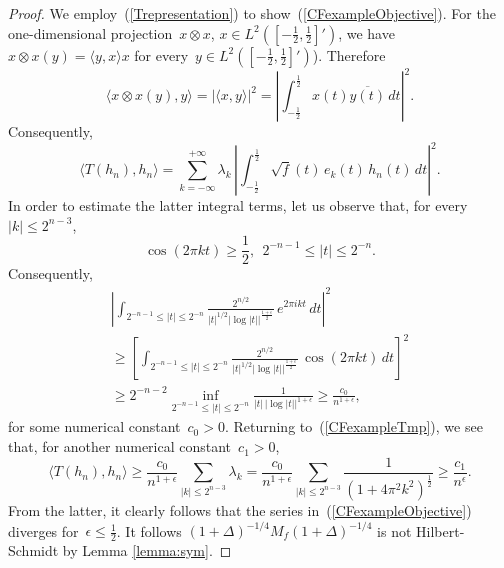 \documentclass[final,1p]{elsarticle}
\numberwithin{equation}{section}
\theoremstyle{plain}
\theoremstyle{definition}
\begin{document}
\begin{proof}
  We employ~(\ref{Trepresentation}) to show~(\ref{CFexampleObjective}).
   For the
  one-dimensional projection~$x \otimes x$, $x \in L^2([-\frac 12,
  \frac 12]')$, we have~$x \otimes x (y) = \langle y, x \rangle x$ for
  every~$y \in L^2([- \frac 12, \frac 12]')$).  Therefore $$ \langle x
  \otimes x (y), y \rangle = \left| \langle x, y \rangle \right|^2 =
  \left| \int_{-\frac 12}^{\frac 12} x(t) \overline{y(t)} \, dt \right|^2. $$
  Consequently,
  \begin{equation}
    \label{CFexampleTmp}
    \langle T(h_n), h_n \rangle = \sum_{k = - \infty}^{+\infty}
    \lambda_k \, \left| \int_{-\frac 12}^{\frac 12} \sqrt{f}(t)\,
       e_k(t)\, h_n(t)\, dt \right|^2. 
  \end{equation}
  In order to estimate the latter integral terms, let us observe that,
  for every~$\left| k \right| \leq 2^{n-3}$, $$ \cos \left( 2 \pi k t
  \right) \geq \frac 12,\ \ 2^{-n-1} \leq \left| t \right| \leq
  2^{-n}. $$ Consequently,
  \begin{multline*}
    \left| \int_{2^{-n-1} \leq \left| t \right| \leq 2^{-n}} \frac
      {2^{n/2}}{\left| t \right|^{1/2} \left| \log |t| \right|^{\frac {1
            +\epsilon}2}} \, e^{2\pi i kt}\, dt \right|^2 \\ \geq
    \left[ \int_{2^{-n-1} \leq \left| t \right| \leq 2^{-n}} \frac
      {2^{n/2}}{\left| t \right|^{1/2} \left| \log |t| \right|^{\frac
          {1+\epsilon}2}} \, \cos \left( 2\pi kt \right)\, dt
    \right]^2 \\ \geq 2^{-n-2} \inf_{2^{-n-1} \leq \left| t \right|
      \leq 2^{-n}} \frac 1 {\left| t \right|\, \left| \log |t|
      \right|^{{1+\epsilon}}} \geq \frac {c_0} {n^{1+\epsilon}},
  \end{multline*}
  for some numerical constant~$c_0 > 0$.  Returning
  to~(\ref{CFexampleTmp}), we see that, for another numerical
  constant~$c_1> 0$, $$ \langle T(h_n), h_n \rangle \geq \frac
  {c_0}{n^{1+\epsilon}} \sum_{\left| k \right| \leq 2^{n-3}}
  {\lambda_k} = \frac {c_0}{n^{1+\epsilon}} \sum_{\left| k \right|
    \leq 2^{n-3}} \frac 1{(1 + 4 \pi^2 k^2)^{\frac 12}} \geq \frac
  {c_1}{n^\epsilon}. $$ From the latter, it clearly follows that the
  series in~(\ref{CFexampleObjective}) diverges for~$\epsilon \leq
  \frac 12$.  It follows $(1+\Delta)^{-1/4}M_{f}(1+\Delta)^{-1/4}$ is not Hilbert-Schmidt by Lemma \ref{lemma:sym}.
\end{proof}
\end{document}
